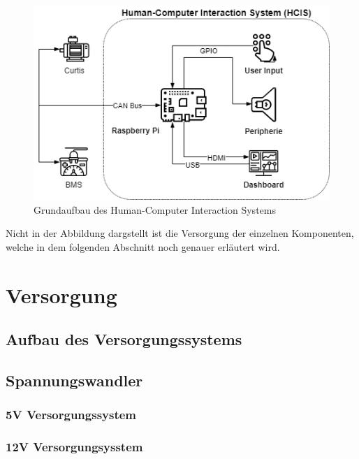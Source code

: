 \begin{figure}[H]
	\begin{center}
		\includegraphics[scale=0.6]{figures/hcis/HCIS_Grundfunktion.png}
		\caption{Grundaufbau des Human-Computer Interaction Systems}
	\end{center}
\end{figure}

Nicht in der Abbildung dargstellt ist die Versorgung der einzelnen Komponenten, welche in dem folgenden Abschnitt noch genauer erläutert wird.

\newpage


\section{Versorgung}
\subsection{Aufbau des Versorgungssystems}
\subsection{Spannungswandler}
\subsubsection{5V Versorgungssystem}
\subsubsection{12V Versorgungsysstem}

\newpage


